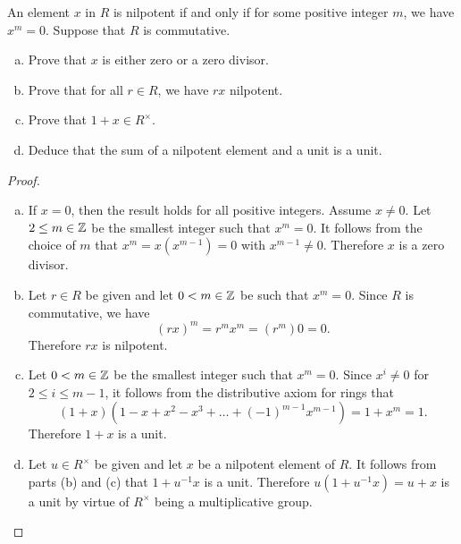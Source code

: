 \documentclass[10pt]{amsart}
\begin{document}
\begin{thm}
  An element $x$ in $R$ is nilpotent if and only if for some positive integer $m$, we have $x^m = 0$.
  Suppose that $R$ is commutative.
  \begin{enumerate}[(a)]
  \item
    Prove that $x$ is either zero or a zero divisor.
  \item
    Prove that for all $r \in R$, we have $rx$ nilpotent.
  \item
    Prove that $1 + x \in R^\times$.
  \item
    Deduce that the sum of a nilpotent element and a unit is a unit.
  \end{enumerate}
  \begin{proof}
    \begin{enumerate}[(a)]
    \item
      If $x = 0$, then the result holds for all positive integers.
      Assume $x \neq 0$.
      Let $2 \leq m \in \mathbb{Z}$ be the smallest integer such that $x^m = 0$.
      It follows from the choice of $m$ that $x^m = x(x^{m-1}) = 0$ with $x^{m-1} \neq 0$.
      Therefore $x$ is a zero divisor.
    \item
      Let $r \in R$ be given and let $0 < m \in \mathbb{Z}$ be such that $x^m = 0$.
      Since $R$ is commutative, we have 
      $$(rx)^m = r^mx^m = (r^m)0 = 0.$$
      Therefore $rx$ is nilpotent.
    \item
      Let $0 < m \in \mathbb{Z}$ be the smallest integer such that $x^m = 0$.
      Since $x^{i} \neq 0$ for $2 \leq i \leq m - 1$, it follows from the distributive axiom for rings that
      $$(1 + x)(1 - x + x^2 - x^3 + \ldots + (-1)^{m-1}x^{m-1}) = 1 + x^m = 1.$$
      Therefore $1+x$ is a unit.
    \item
      Let $u \in R^\times$ be given and let $x$ be a nilpotent element of $R$.
      It follows from parts (b) and (c) that $1 + u^{-1}x$ is a unit.
      Therefore $u(1 + u^{-1}x) = u + x$ is a unit by virtue of $R^\times$ being a multiplicative group.
    \end{enumerate}
  \end{proof}
\end{thm}
\end{document}
